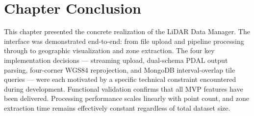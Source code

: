 \section*{Chapter Conclusion}

This chapter presented the concrete realization of the LiDAR Data Manager. The interface was demonstrated end-to-end: from file upload and pipeline processing through to geographic visualization and zone extraction. The four key implementation decisions — streaming upload, dual-schema PDAL output parsing, four-corner WGS84 reprojection, and MongoDB interval-overlap tile queries — were each motivated by a specific technical constraint encountered during development. Functional validation confirms that all MVP features have been delivered. Processing performance scales linearly with point count, and zone extraction time remains effectively constant regardless of total dataset size.